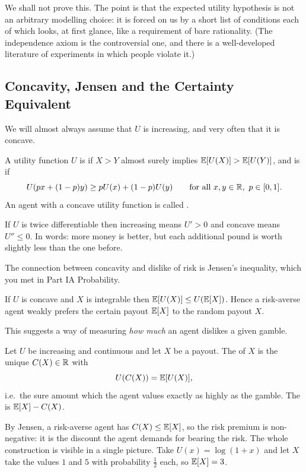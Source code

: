 \documentclass[a4paper]{scrartcl}
\begin{document}
We shall not prove this. The point is that the expected utility hypothesis is not an arbitrary modelling choice: it is forced on us by a short list of conditions each of which looks, at first glance, like a requirement of bare rationality. (The independence axiom is the controversial one, and there is a well-developed literature of experiments in which people violate it.)

\subsection{Concavity, Jensen and the Certainty Equivalent}

We will almost always assume that $U$ is increasing, and very often that it is concave.

\begin{definition}
	A utility function $U$ is  if $X > Y$ almost surely implies $\mathbb{E}[U(X)] > \mathbb{E}[U(Y)]$, and is  if
	$$
	U(px + (1-p)y) \geq pU(x) + (1-p)U(y) \qquad \text{for all } x,y \in \mathbb{R},\ p \in [0,1].
	$$
	An agent with a concave utility function is called .
\end{definition}

If $U$ is twice differentiable then increasing means $U' > 0$ and concave means $U'' \leq 0$. In words: more money is better, but each additional pound is worth slightly less than the one before.

The connection between concavity and dislike of risk is Jensen's inequality, which you met in Part IA Probability.

\begin{proposition}
	If $U$ is concave and $X$ is integrable then $\mathbb{E}[U(X)] \leq U(\mathbb{E}[X])$. Hence a risk-averse agent weakly prefers the certain payout $\mathbb{E}[X]$ to the random payout $X$.
\end{proposition}

This suggests a way of measuring \emph{how much} an agent dislikes a given gamble.

\begin{definition}
	Let $U$ be increasing and continuous and let $X$ be a payout. The  of $X$ is the unique $C(X) \in \mathbb{R}$ with
	$$
	U(C(X)) = \mathbb{E}[U(X)],
	$$
	i.e.\ the sure amount which the agent values exactly as highly as the gamble. The  is $\mathbb{E}[X] - C(X)$.
\end{definition}

By Jensen, a risk-averse agent has $C(X) \leq \mathbb{E}[X]$, so the risk premium is non-negative: it is the discount the agent demands for bearing the risk. The whole construction is visible in a single picture. Take $U(x) = \log(1+x)$ and let $X$ take the values $1$ and $5$ with probability $\tfrac12$ each, so $\mathbb{E}[X] = 3$.
\end{document}
